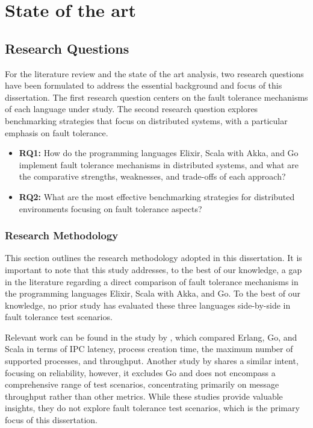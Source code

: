 \chapter{State of the art} 
\label{chap:State}

%
\section{Research Questions}

For the literature review and the state of the art analysis, two research questions have been formulated to address the essential background and focus of this dissertation. The first research question centers on the fault tolerance mechanisms of each language under study. The second research question explores benchmarking strategies that focus on distributed systems, with a particular emphasis on fault tolerance.

\begin{itemize}
    \item \textbf{RQ1:} How do the programming languages Elixir, Scala with Akka, and Go implement fault tolerance mechanisms in distributed systems, and what are the comparative strengths, weaknesses, and trade-offs of each approach?
    \item \textbf{RQ2:} What are the most effective benchmarking strategies for distributed environments focusing on fault tolerance aspects?
\end{itemize}

\subsection{Research Methodology}

This section outlines the research methodology adopted in this dissertation. It is important to note that this study addresses, to the best of our knowledge, a gap in the literature regarding a direct comparison of fault tolerance mechanisms in the programming languages Elixir, Scala with Akka, and Go. To the best of our knowledge, no prior study has evaluated these three languages side-by-side in fault tolerance test scenarios.

Relevant work can be found in the study by \textcite{Valkov2018}, which compared Erlang, Go, and Scala in terms of \gls{IPC} latency, process creation time, the maximum number of supported processes, and throughput. Another study by \textcite{Randtoul2022} shares a similar intent, focusing on reliability, however, it excludes Go and does not encompass a comprehensive range of test scenarios, concentrating primarily on message throughput rather than other metrics. While these studies provide valuable insights, they do not explore fault tolerance test scenarios, which is the primary focus of this dissertation.

